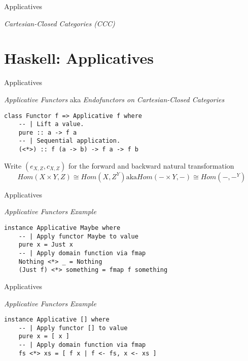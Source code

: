 \documentclass[10pt]{beamer}
\theoremstyle{definition}
\theoremstyle{remark}
\numberwithin{equation}{section}
\begin{document}
\begin{frame}[fragile]{Applicatives}

  \emph{Cartesian-Closed Categories (CCC)}



\end{frame}

\section{Haskell: Applicatives}

\begin{frame}[fragile]{Applicatives}

  \emph{Applicative Functors}
  aka \emph{Endofunctors on Cartesian-Closed Categories}

  \begin{lstlisting}[frame=single]
class Functor f => Applicative f where
    -- | Lift a value.
    pure :: a -> f a
    -- | Sequential application.
    (<*>) :: f (a -> b) -> f a -> f b
  \end{lstlisting}

  Write $(e_{X,Z},c_{X,Z})$ for the forward and backward natural transformation
  \begin{equation}
    Hom(X\times Y,Z) \cong Hom(X,Z^Y) \mathrm{aka} Hom(- \times Y,-) \cong Hom(-,-^Y)
  \end{equation}
  
\end{frame}

\begin{frame}[fragile]{Applicatives}

  \emph{Applicative Functors Example}

  \begin{lstlisting}[frame=single]
instance Applicative Maybe where
    -- | Apply functor Maybe to value
    pure x = Just x
    -- | Apply domain function via fmap
    Nothing <*> _ = Nothing
    (Just f) <*> something = fmap f something
  \end{lstlisting}

\end{frame}

\begin{frame}[fragile]{Applicatives}

  \emph{Applicative Functors Example}

  \begin{lstlisting}[frame=single]
instance Applicative [] where
    -- | Apply functor [] to value
    pure x = [ x ]
    -- | Apply domain function via fmap
    fs <*> xs = [ f x | f <- fs, x <- xs ]
  \end{lstlisting}

\end{frame}
\end{document}
